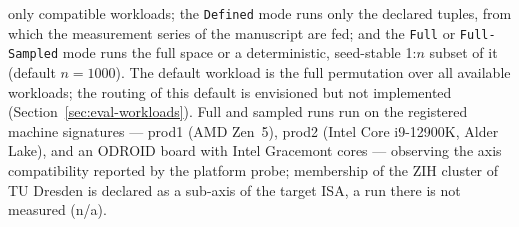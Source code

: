 \begin{nurlang}
only compatible workloads; the \texttt{Defined} mode runs only the declared tuples, from which
the measurement series of the manuscript are fed; and the \texttt{Full} or \texttt{Full-Sampled} mode
runs the full space or a deterministic, seed-stable 1:$n$ subset of it (default $n = 1000$).
The default workload is the full permutation over all available workloads; the routing of this
default is envisioned but not implemented (Section~\ref{sec:eval-workloads}). Full and sampled runs run on the registered
machine signatures --- prod1 (AMD Zen~5), prod2 (Intel Core i9-12900K, Alder Lake), and an
ODROID board with Intel Gracemont cores --- observing the axis compatibility reported by the platform
probe; membership of the ZIH cluster of TU Dresden is declared as a sub-axis of the
target ISA, a run there is not measured (n/a).
\end{nurlang}
